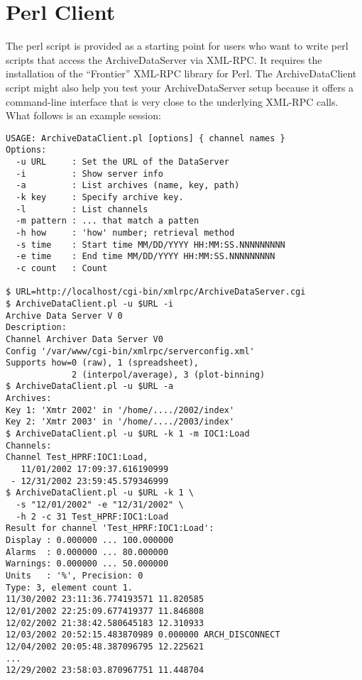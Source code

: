 \section{Perl Client} \label{sec:perlclient}
The  perl script is provided as a starting point
for users who want to write perl scripts that access the
ArchiveDataServer via XML-RPC. It requires the installation of the
``Frontier'' XML-RPC library for Perl.  The ArchiveDataClient script
might also help you test your ArchiveDataServer setup because it
offers a command-line interface that is very close to the underlying
XML-RPC calls. What follows is an example session:

\begin{lstlisting}[frame=none,keywordstyle=\sffamily]
USAGE: ArchiveDataClient.pl [options] { channel names } 
Options:
  -u URL     : Set the URL of the DataServer
  -i         : Show server info
  -a         : List archives (name, key, path)
  -k key     : Specify archive key.
  -l         : List channels
  -m pattern : ... that match a patten
  -h how     : 'how' number; retrieval method
  -s time    : Start time MM/DD/YYYY HH:MM:SS.NNNNNNNNN
  -e time    : End time MM/DD/YYYY HH:MM:SS.NNNNNNNNN
  -c count   : Count

$ URL=http://localhost/cgi-bin/xmlrpc/ArchiveDataServer.cgi
$ ArchiveDataClient.pl -u $URL -i
Archive Data Server V 0
Description:
Channel Archiver Data Server V0
Config '/var/www/cgi-bin/xmlrpc/serverconfig.xml'
Supports how=0 (raw), 1 (spreadsheet),
             2 (interpol/average), 3 (plot-binning)
$ ArchiveDataClient.pl -u $URL -a
Archives:
Key 1: 'Xmtr 2002' in '/home/..../2002/index'
Key 2: 'Xmtr 2003' in '/home/..../2003/index'
$ ArchiveDataClient.pl -u $URL -k 1 -m IOC1:Load
Channels:
Channel Test_HPRF:IOC1:Load,
   11/01/2002 17:09:37.616190999
 - 12/31/2002 23:59:45.579346999
$ ArchiveDataClient.pl -u $URL -k 1 \
  -s "12/01/2002" -e "12/31/2002" \
  -h 2 -c 31 Test_HPRF:IOC1:Load
Result for channel 'Test_HPRF:IOC1:Load':
Display : 0.000000 ... 100.000000
Alarms  : 0.000000 ... 80.000000
Warnings: 0.000000 ... 50.000000
Units   : '%', Precision: 0
Type: 3, element count 1.
11/30/2002 23:11:36.774193571 11.820585
12/01/2002 22:25:09.677419377 11.846808
12/02/2002 21:38:42.580645183 12.310933
12/03/2002 20:52:15.483870989 0.000000 ARCH_DISCONNECT
12/04/2002 20:05:48.387096795 12.225621
...
12/29/2002 23:58:03.870967751 11.448704
\end{lstlisting}
